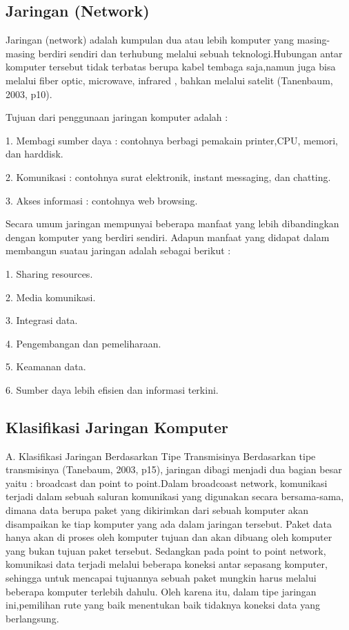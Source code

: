 \documentclass{jtetiproposalskripsi}
\begin{document}
\subsection{Jaringan (Network)}


	Jaringan (network) adalah kumpulan dua atau lebih komputer yang
masing-masing berdiri sendiri dan terhubung melalui sebuah teknologi.Hubungan antar komputer tersebut tidak terbatas berupa kabel tembaga saja,namun juga bisa melalui fiber optic, microwave, infrared , bahkan melalui satelit (Tanenbaum, 2003, p10).

Tujuan dari penggunaan jaringan komputer adalah :

1. Membagi sumber daya : contohnya berbagi pemakain printer,CPU,
   memori, dan harddisk.

2. Komunikasi : contohnya surat elektronik, instant messaging,             dan chatting.

3. Akses informasi : contohnya web browsing. 

Secara umum jaringan mempunyai beberapa manfaat yang lebih
dibandingkan dengan komputer yang berdiri sendiri. Adapun manfaat yang didapat dalam membangun suatau jaringan adalah sebagai berikut :

1. Sharing resources.

2. Media komunikasi.

3. Integrasi data.

4. Pengembangan dan pemeliharaan.

5. Keamanan data.

6. Sumber daya lebih efisien dan informasi terkini.


\subsection{Klasifikasi Jaringan Komputer}

A. Klasifikasi Jaringan Berdasarkan Tipe Transmisinya 				Berdasarkan tipe transmisinya (Tanebaum, 2003, p15), jaringan dibagi menjadi dua bagian besar yaitu : broadcast dan point to point.Dalam broadcoast network, komunikasi terjadi dalam sebuah saluran komunikasi yang digunakan secara bersama-sama, dimana data berupa paket yang dikirimkan dari sebuah komputer akan disampaikan ke tiap komputer yang ada dalam jaringan tersebut. Paket data hanya akan di proses oleh komputer tujuan dan akan dibuang oleh komputer yang bukan tujuan paket tersebut. Sedangkan pada point to point network, komunikasi data terjadi
melalui beberapa koneksi antar sepasang komputer, sehingga untuk
mencapai tujuannya sebuah paket mungkin harus melalui beberapa
komputer terlebih dahulu.
Oleh karena itu, dalam tipe jaringan ini,pemilihan rute yang baik menentukan baik tidaknya koneksi data yang berlangsung.
\end{document}
